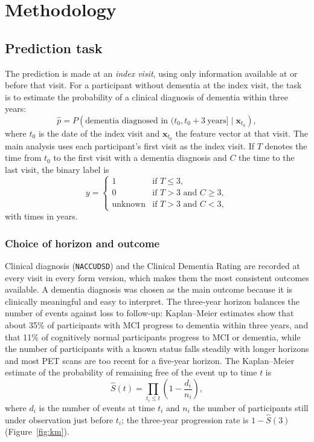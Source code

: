 \chapter{Methodology}
\label{ch:method}

\section{Prediction task}

The prediction is made at an \emph{index visit}, using only information available at or before that visit. For a participant without dementia at the index visit, the task is to estimate the probability of a clinical diagnosis of dementia within three years:
\begin{equation}
\hat{p} = P\left(\text{dementia diagnosed in } (t_0, t_0 + 3\ \text{years}] \mid \mathbf{x}_{t_0}\right),
\end{equation}
where $t_0$ is the date of the index visit and $\mathbf{x}_{t_0}$ the feature vector at that visit. The main analysis uses each participant's first visit as the index visit. If $T$ denotes the time from $t_0$ to the first visit with a dementia diagnosis and $C$ the time to the last visit, the binary label is
\begin{equation}
y = \begin{cases}
1 & \text{if } T \le 3, \\
0 & \text{if } T > 3 \text{ and } C \ge 3, \\
\text{unknown} & \text{if } T > 3 \text{ and } C < 3,
\end{cases}
\end{equation}
with times in years.

\subsection{Choice of horizon and outcome}

Clinical diagnosis (\texttt{NACCUDSD}) and the Clinical Dementia Rating are recorded at every visit in every form version, which makes them the most consistent outcomes available. A dementia diagnosis was chosen as the main outcome because it is clinically meaningful and easy to interpret. The three-year horizon balances the number of events against loss to follow-up: Kaplan--Meier estimates \cite{kaplan1958} show that about 35\% of participants with MCI progress to dementia within three years, and that 11\% of cognitively normal participants progress to MCI or dementia, while the number of participants with a known status falls steadily with longer horizons and most PET scans are too recent for a five-year horizon. The Kaplan--Meier estimate of the probability of remaining free of the event up to time $t$ is
\begin{equation}
\hat{S}(t) = \prod_{t_i \le t} \left(1 - \frac{d_i}{n_i}\right),
\end{equation}
where $d_i$ is the number of events at time $t_i$ and $n_i$ the number of participants still under observation just before $t_i$; the three-year progression rate is $1 - \hat{S}(3)$ (Figure~\ref{fig:km}).

